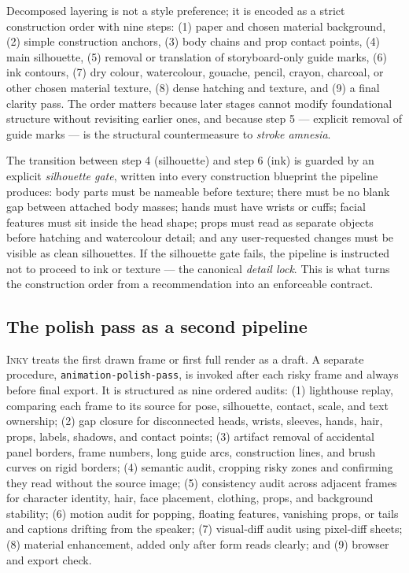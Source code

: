 \documentclass[10pt,twocolumn]{article}
\newcommand{\term}[1]{\textit{#1}}
\newcommand{\inky}{\textsc{Inky}}
\begin{document}
Decomposed layering is not a style preference; it is encoded as a
strict construction order with nine steps: (1) paper and chosen
material background, (2) simple construction anchors, (3) body
chains and prop contact points, (4) main silhouette, (5) removal
or translation of storyboard-only guide marks, (6) ink contours,
(7) dry colour, watercolour, gouache, pencil, crayon, charcoal, or
other chosen material texture, (8) dense hatching and texture, and
(9) a final clarity pass. The order matters because later stages
cannot modify foundational structure without revisiting earlier
ones, and because step 5 --- explicit removal of guide marks --- is
the structural countermeasure to \term{stroke amnesia}.

The transition between step 4 (silhouette) and step 6 (ink) is
guarded by an explicit \emph{silhouette gate}, written into every
construction blueprint the pipeline produces: body parts must be
nameable before texture; there must be no blank gap between
attached body masses; hands must have wrists or cuffs; facial
features must sit inside the head shape; props must read as
separate objects before hatching and watercolour detail; and any
user-requested changes must be visible as clean silhouettes. If
the silhouette gate fails, the pipeline is instructed not to
proceed to ink or texture --- the canonical \emph{detail lock}.
This is what turns the construction order from a recommendation
into an enforceable contract.

\subsection{The polish pass as a second pipeline}

\inky{} treats the first drawn frame or first full render as a
draft. A separate procedure, \texttt{animation-polish-pass}, is
invoked after each risky frame and always before final export. It
is structured as nine ordered audits: (1) lighthouse replay,
comparing each frame to its source for pose, silhouette, contact,
scale, and text ownership; (2) gap closure for disconnected heads,
wrists, sleeves, hands, hair, props, labels, shadows, and contact
points; (3) artifact removal of accidental panel borders, frame
numbers, long guide arcs, construction lines, and brush curves on
rigid borders; (4) semantic audit, cropping risky zones and
confirming they read without the source image; (5) consistency
audit across adjacent frames for character identity, hair, face
placement, clothing, props, and background stability; (6) motion
audit for popping, floating features, vanishing props, or tails
and captions drifting from the speaker; (7) visual-diff audit
using pixel-diff sheets; (8) material enhancement, added only
after form reads clearly; and (9) browser and export check.
\end{document}
